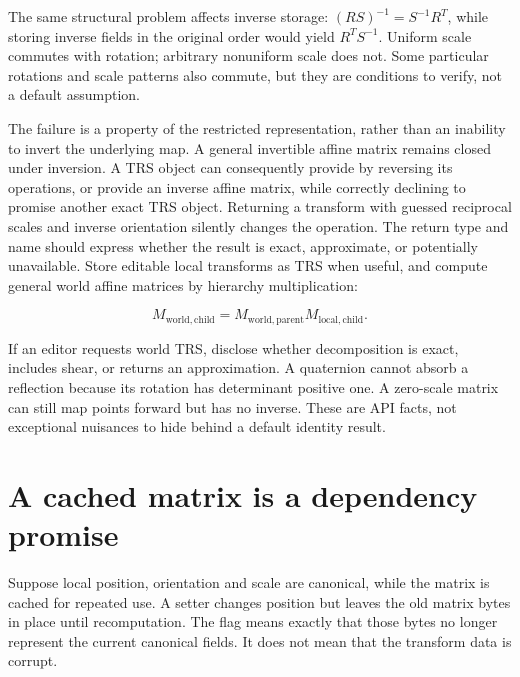 The same structural problem affects inverse storage: \((RS)^{-1}=S^{-1}R^T\), while storing inverse fields in the original order would yield \(R^TS^{-1}\). Uniform scale commutes with rotation; arbitrary nonuniform scale does not. Some particular rotations and scale patterns also commute, but they are conditions to verify, not a default assumption.

The failure is a property of the restricted representation, rather than an inability to invert the underlying map. A general invertible affine matrix remains closed under inversion. A TRS object can consequently provide  by reversing its operations, or provide an inverse affine matrix, while correctly declining to promise another exact TRS object. Returning a transform with guessed reciprocal scales and inverse orientation silently changes the operation. The return type and name should express whether the result is exact, approximate, or potentially unavailable. Store editable local transforms as TRS when useful, and compute general world affine matrices by hierarchy multiplication:

\[
M_{\mathrm{world,child}}=M_{\mathrm{world,parent}}M_{\mathrm{local,child}}.
\]

If an editor requests world TRS, disclose whether decomposition is exact, includes shear, or returns an approximation. A quaternion cannot absorb a reflection because its rotation has determinant positive one. A zero-scale matrix can still map points forward but has no inverse. These are API facts, not exceptional nuisances to hide behind a default identity result.

\section{A cached matrix is a dependency promise}\label{01-foundations-i-ch019-a-cached-matrix-is-a-dependency-promise}

\hypertarget{01-foundations-i-ch019-a-cached-matrix-is-a-dependency-promise}{}

Suppose local position, orientation and scale are canonical, while the matrix is cached for repeated use. A setter changes position but leaves the old matrix bytes in place until recomputation. The flag  means exactly that those bytes no longer represent the current canonical fields. It does not mean that the transform data is corrupt.

